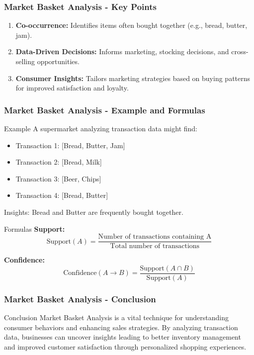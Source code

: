 \documentclass[aspectratio=169]{beamer}
\begin{document}
\begin{frame}[fragile]
    \frametitle{Market Basket Analysis - Key Points}
    \begin{enumerate}
        \item \textbf{Co-occurrence:} Identifies items often bought together (e.g., bread, butter, jam).
        \item \textbf{Data-Driven Decisions:} Informs marketing, stocking decisions, and cross-selling opportunities.
        \item \textbf{Consumer Insights:} Tailors marketing strategies based on buying patterns for improved satisfaction and loyalty.
    \end{enumerate}
\end{frame}

\begin{frame}[fragile]
    \frametitle{Market Basket Analysis - Example and Formulas}
    \begin{block}{Example}
        A supermarket analyzing transaction data might find:
        \begin{itemize}
            \item Transaction 1: [Bread, Butter, Jam]
            \item Transaction 2: [Bread, Milk]
            \item Transaction 3: [Beer, Chips]
            \item Transaction 4: [Bread, Butter]
        \end{itemize}
        Insights: Bread and Butter are frequently bought together.
    \end{block}
    
    \begin{block}{Formulas}
        \textbf{Support:} 
        \begin{equation}
            \text{Support}(A) = \frac{\text{Number of transactions containing A}}{\text{Total number of transactions}}
        \end{equation}

        \textbf{Confidence:} 
        \begin{equation}
            \text{Confidence}(A \rightarrow B) = \frac{\text{Support}(A \cap B)}{\text{Support}(A)}
        \end{equation}
    \end{block}
\end{frame}

\begin{frame}[fragile]
    \frametitle{Market Basket Analysis - Conclusion}
    \begin{block}{Conclusion}
        Market Basket Analysis is a vital technique for understanding consumer behaviors and enhancing sales strategies. By analyzing transaction data, businesses can uncover insights leading to better inventory management and improved customer satisfaction through personalized shopping experiences.
    \end{block}
\end{frame}
\end{document}
